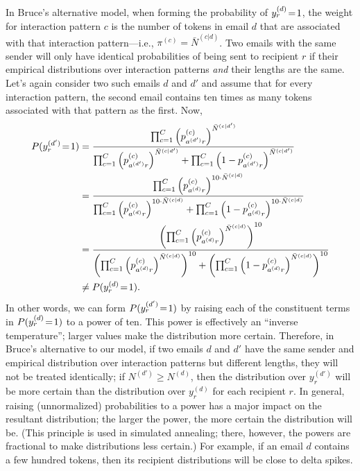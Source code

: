 \documentclass[10pt,english,oneside]{article}
\begin{document}
In Bruce's alternative model, when forming the probability of
$y_r^{(d)} \!=\! 1$, the weight for interaction pattern $c$ is the
number of tokens in email $d$ that are associated with that
interaction pattern---i.e., $\pi^{(c)} = \bar{N}^{(c|d)}$. Two emails
with the same sender will only have identical probabilities of being
sent to recipient $r$ if their empirical distributions over
interaction patterns \emph{and} their lengths are the same. Let's
again consider two such emails $d$ and $d'$ and assume that for every
interaction pattern, the second email contains ten times as many
tokens associated with that pattern as the first. Now,
\begin{align}
P(y^{(d')}_r \!=\! 1)
&= \frac{\prod_{c=1}^C \left( p^{(c)}_{a^{(d')}r}
  \right)^{\bar{N}^{(c|d')}}}{\prod_{c=1}^C \left(
  p^{(c)}_{a^{(d')}r}\right)^{\bar{N}^{(c|d')}} + \prod_{c=1}^C \left( 1 -
  p^{(c)}_{a^{(d')}r}\right)^{\bar{N}^{(c|d')}}}\\
&= \frac{\prod_{c=1}^C \left( p^{(c)}_{a^{(d)}r}
  \right)^{10 \cdot \bar{N}^{(c|d)}}}{\prod_{c=1}^C \left(
  p^{(c)}_{a^{(d)}r}\right)^{10 \cdot \bar{N}^{(c|d)}} + \prod_{c=1}^C \left( 1 -
  p^{(c)}_{a^{(d)}r}\right)^{10 \cdot \bar{N}^{(c|d)}}}\\
&= \frac{\left( \prod_{c=1}^C \left( p^{(c)}_{a^{(d)}r}
  \right)^{\bar{N}^{(c|d)}}\right)^{10}}{\left(\prod_{c=1}^C \left(
  p^{(c)}_{a^{(d)}r}\right)^{\bar{N}^{(c|d)}}\right)^{10} +\left( \prod_{c=1}^C \left( 1 -
  p^{(c)}_{a^{(d)}r}\right)^{\bar{N}^{(c|d)}}\right)^{10}}\\
&\neq P(y^{(d)}_r \!=\! 1).
  \end{align}
In other words, we can form $P(y^{(d')}_r \!=\! 1)$ by raising each of
the constituent terms in $P(y^{(d)}_r \!=\! 1)$ to a power of ten. This
power is effectively an ``inverse temperature''; larger values make
the distribution more certain. Therefore, in Bruce's alternative to
our model, if two emails $d$ and $d'$ have the same sender and
empirical distribution over interaction patterns but different
lengths, they will not be treated identically; if $N^{(d')} \geq
N^{(d)}$, then the distribution over $y^{(d')}_r$ will be more certain
than the distribution over $y^{(d)}_r$ for each recipient $r$. In
general, raising (unnormalized) probabilities to a power has a major
impact on the resultant distribution; the larger the power, the more
certain the distribution will be. (This principle is used in simulated
annealing; there, however, the powers are fractional to make
distributions less certain.) For example, if an email $d$ contains a
few hundred tokens, then its recipient distributions will be close to
delta spikes.
\end{document}
